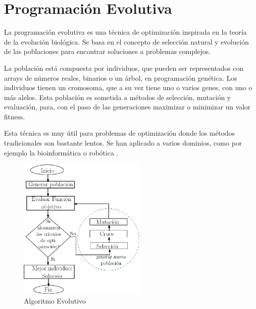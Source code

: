 \section{Programación Evolutiva}


La programación evolutiva es una técnica de optimización inspirada en la teoría de la evolución biológica. Se basa en el concepto de selección natural y evolución de las poblaciones para encontrar soluciones a problemas complejos. 

La población está compuesta por individuos, que pueden ser representados con arrays de números reales, binarios o un árbol, en programación genética. Los individuos tienen un cromosoma, que a su vez tiene uno o varios genes, con uno o más alelos. Esta población es sometida a métodos de selección, mutación y evaluación, para, con el paso de las generaciones maximizar o minimizar un valor fitness.

Esta técnica es muy útil para problemas de optimización donde los métodos tradicionales son bastante lentos.  Se han aplicado a varios dominios, como por ejemplo la bioinformática o robótica \cite{contreras2015mobile}.


\begin{figure}[!h]
	\centering
	\includegraphics[width=0.55\textwidth]{images/chapter_2/AG}
	\caption{Algoritmo Evolutivo}
	\label{fig:AG}
\end{figure}


\newpage

























